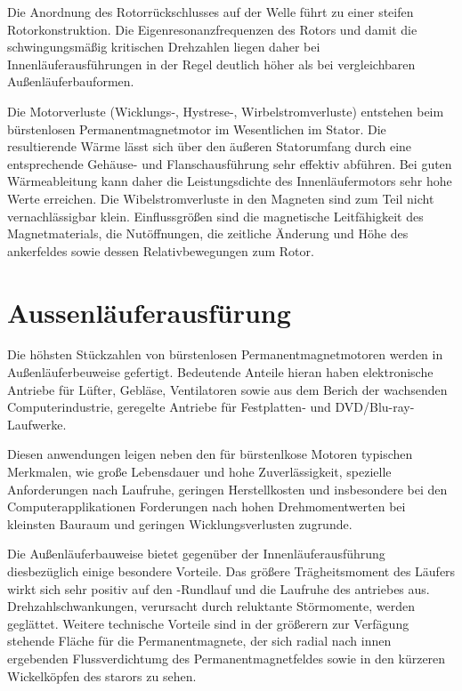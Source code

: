 Die Anordnung des Rotorrückschlusses auf der Welle führt zu einer steifen Rotorkonstruktion. Die Eigenresonanzfrequenzen des Rotors und damit die schwingungsmäßig kritischen Drehzahlen liegen daher bei Innenläuferausführungen in der Regel deutlich höher als bei vergleichbaren Außenläuferbauformen.

Die Motorverluste (Wicklungs-, Hystrese-, Wirbelstromverluste) entstehen beim bürstenlosen Permanentmagnetmotor im Wesentlichen im Stator. Die resultierende Wärme lässt sich über den äußeren Statorumfang durch eine entsprechende Gehäuse- und Flanschausführung sehr effektiv abführen. Bei guten Wärmeableitung kann daher die Leistungsdichte des Innenläufermotors sehr hohe Werte erreichen. Die Wibelstromverluste in den Magneten sind zum Teil nicht vernachlässigbar klein. Einflussgrößen sind die magnetische Leitfähigkeit des Magnetmaterials, die Nutöffnungen, die zeitliche Änderung und Höhe des ankerfeldes sowie dessen Relativbewegungen zum Rotor.\parencite[S. 75-76]{Stölting2011}
\section{Aussenläuferausfürung}
Die höhsten Stückzahlen von bürstenlosen Permanentmagnetmotoren werden in Außenläuferbeuweise gefertigt. Bedeutende Anteile hieran haben elektronische Antriebe für Lüfter, Gebläse, Ventilatoren sowie aus dem Berich der wachsenden Computerindustrie, geregelte Antriebe für Festplatten- und DVD/Blu-ray-Laufwerke.

Diesen anwendungen leigen neben den für bürstenlkose Motoren typischen Merkmalen, wie große Lebensdauer und hohe Zuverlässigkeit, spezielle Anforderungen nach Laufruhe, geringen Herstellkosten und insbesondere bei den Computerapplikationen Forderungen nach hohen Drehmomentwerten bei kleinsten Bauraum und geringen Wicklungsverlusten zugrunde.

Die Außenläuferbauweise bietet gegenüber der Innenläuferausführung diesbezüglich einige besondere Vorteile. Das größere Trägheitsmoment des Läufers wirkt sich sehr positiv auf den -Rundlauf und die Laufruhe des antriebes aus. Drehzahlschwankungen, verursacht durch reluktante Störmomente, werden geglättet. Weitere technische Vorteile sind in der größerern zur Verfägung stehende Fläche für die Permanentmagnete, der sich radial nach innen ergebenden Flussverdichtumg des Permanentmagnetfeldes sowie in den kürzeren Wickelköpfen des starors zu sehen.

